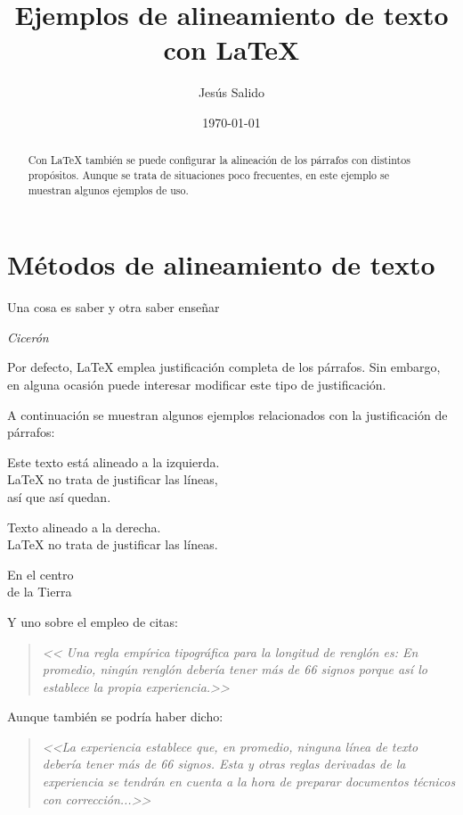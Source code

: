 \documentclass[11pt,a4paper]{report}
\title{Ejemplos de alineamiento de texto con \LaTeX}
\author{Jesús Salido}
\date{\today}
\begin{document}
\maketitle

\begin{abstract}
	Con \LaTeX{} también se puede configurar la alineación de los párrafos con distintos propósitos. Aunque se trata de situaciones poco frecuentes, en este ejemplo se muestran algunos ejemplos de uso.
\end{abstract}

\chapter{Métodos de alineamiento de texto}
\epigraph{Una cosa es saber y otra saber enseñar}{\textit{Cicerón}}
Por defecto, \LaTeX{} emplea justificación completa de los párrafos. Sin embargo, en alguna ocasión puede interesar modificar este tipo de justificación. 

A continuación se muestran algunos ejemplos relacionados con la justificación de párrafos:

\begin{flushleft}
	Este texto está alineado a la izquierda. \\
	\LaTeX{} no trata de justificar las líneas, \\ 
	así que así quedan.
\end{flushleft}

\begin{flushright}
	Texto alineado a la derecha. \\
	\LaTeX{} no trata de justificar las líneas.
\end{flushright}

\begin{center}
	En el centro\\
	de la Tierra
\end{center}


\noindent Y uno sobre el empleo de citas:


\begin{quote}
\emph{<<
Una regla empírica tipográfica para la longitud de renglón es: En promedio, ningún renglón debería tener más de 66 signos porque así lo establece la propia experiencia.>>}
\end{quote}

\noindent Aunque también se podría haber dicho:

\begin{quote}
\emph{<<La experiencia establece que, en promedio, ninguna línea de texto debería tener más de 66 signos. Esta y otras reglas derivadas de la experiencia se tendrán en cuenta a la hora de preparar documentos técnicos con corrección...>>}
\end{quote}
\end{document}
